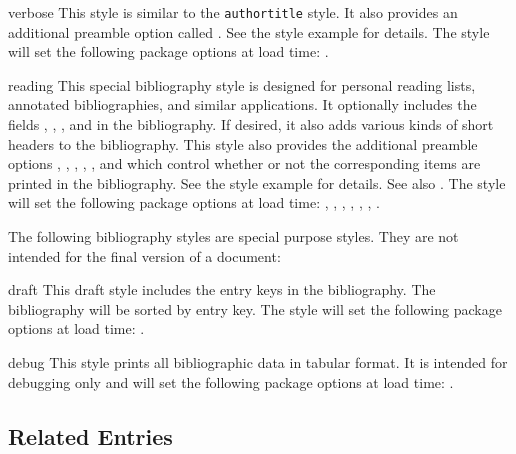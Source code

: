 \documentclass{ltxdockit}[2011/03/25]
\begin{document}
\begin{marglist}
\item[verbose]
This style is similar to the \texttt{authortitle} style. It also provides an additional preamble option called . See the style example for details. The style will set the following package options at load time: .

\item[reading]
This special bibliography style is designed for personal reading lists, annotated bibliographies, and similar applications. It optionally includes the fields , , , and  in the bibliography. If desired, it also adds various kinds of short headers to the bibliography. This style also provides the additional preamble options , , , , , and  which control whether or not the corresponding items are printed in the bibliography. See the style example for details. See also . The style will set the following package options at load time: , , , , , , .

\end{marglist}

The following bibliography styles are special purpose styles. They are not intended for the final version of a document:

\begin{marglist}

\item[draft]
This draft style includes the entry keys in the bibliography. The bibliography will be sorted by entry key. The style will set the following package options at load time: .

\item[debug]
This style prints all bibliographic data in tabular format. It is intended for debugging only and will set the following package options at load time: .

\end{marglist}

\subsection{Related Entries}
\label{use:rel}
\end{document}
